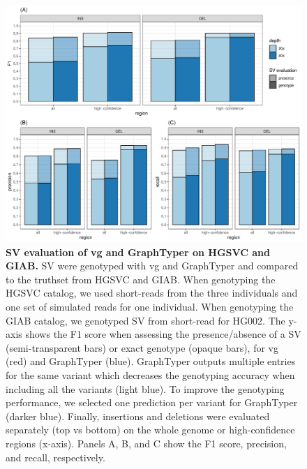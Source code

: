 \documentclass[11pt]{ucscthesis}
\begin{document}
\begin{figure}[H]
    \centering
    \includegraphics[width=.9\linewidth, page=2]{fig-sveval.pdf}
    \caption[SV evaluation of vg and GraphTyper on HGSVC and GIAB]{{\bf SV evaluation of vg and GraphTyper on HGSVC and GIAB.}
      SV were genotyped with vg and GraphTyper and compared to the truthset from HGSVC\cite{chaisson_sv_2019} and GIAB\cite{zook_robust_2020}.
      When genotyping the HGSVC catalog, we used short-reads from the three individuals and one set of simulated reads for one individual.
      When genotyping the GIAB catalog, we genotyped SV from short-read for HG002.
      The y-axis shows the F1 score when assessing the presence/absence of a SV (semi-transparent bars) or exact genotype (opaque bars), for vg (red) and GraphTyper (blue).
      GraphTyper outputs multiple entries for the same variant which decreases the genotyping accuracy when including all the variants (light blue).
      To improve the genotyping performance, we selected one prediction per variant for GraphTyper (darker blue).
      Finally, insertions and deletions were evaluated separately (top vs bottom) on the whole genome or high-confidence regions (x-axis).
      Panels A, B, and C show the F1 score, precision, and recall, respectively.
      }
    \label{fig:graphtyper_eval}
\end{figure}
\end{document}
